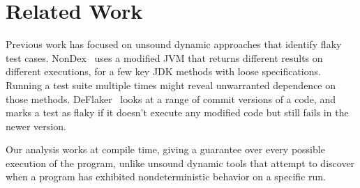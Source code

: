 \section{Related Work\label{sec:related}}
Previous work has focused on unsound dynamic
approaches that identify flaky test cases.
NonDex~\cite{ShiGLM2016} uses a modified JVM that returns different results on different
executions, for a few key JDK methods with loose specifications.  Running a
test suite multiple times might reveal unwarranted dependence on those
methods.
DeFlaker~\cite{BellLHEYM2018} looks at a range of commit versions
of a code, and marks a test as flaky if it doesn't execute any modified
code but still fails in the newer version.

Our analysis works at compile time, giving a guarantee over every possible
execution of the program, unlike unsound dynamic tools that attempt
to discover when a program has exhibited nondeterministic behavior on a
specific run.  


